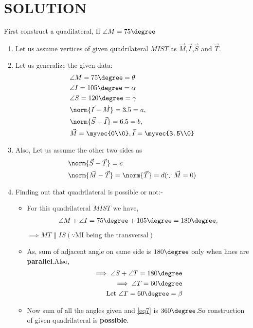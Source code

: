 \documentclass[journal,12pt,twocolumn]{IEEEtran}
\begin{document}
\section{SOLUTION}
 First construct a quadilateral, If $\angle M=75\degree$
\begin{enumerate}
\item Let us assume vertices of given quadrilateral $MIST$ as $\vec{M}$,$\vec{I}$,$\vec{S}$ and $\vec{T}$.
\item Let us generalize the given data:
    \begin{align}
    &\angle M= 75\degree=\theta \label{eq1}
    \\
    &\angle I= 105\degree=\alpha
    \\
    &\angle S= 120\degree=\gamma \label{eq2}
    \\
    &\norm{\vec{I}-\vec{M}} =3.5=a, \label{eq3}
    \\
    &\norm{\vec{S}-\vec{I}} =6.5=b,\label{eq4}
    \\
    &\vec{M}=\myvec{0\\0}, \vec{I}=\myvec{3.5\\0}
    \end{align}
\item Also, Let us assume the other two sides as
\begin{align}
 &\norm{\vec{S}-\vec{T}}=c \label{eq5}
 \\
  &\norm{\vec{M}-\vec{T}}=\norm{\vec{T}} =d \label{eq6} (\because \vec{M}=0)
\end{align}  
\item Finding out that quadrilateral is possible or not:-
\begin{itemize}
\item For this quadrilateral $MIST$ we have,
\begin{align}
\angle M +\angle I = 75\degree + 105\degree =180\degree,
\end{align}
$ \implies MT \parallel IS (\because \text {MI being the transversal})$
\\
\item As, sum of adjacent angle on same side is $180\degree$ only when lines are \textbf{parallel}.Also,
\begin{align}
\implies \angle S + \angle T = 180\degree 
\\
\implies \angle T = 60\degree 
\\
\text{Let }\angle T = 60\degree =\beta \label{eq7}
\end{align}
\item Now sum of all the angles given and \eqref{eq7} is $360\degree$.So construction of given quadrilateral is \textbf{possible}.

\end{itemize}
\end{enumerate}
\end{document}
